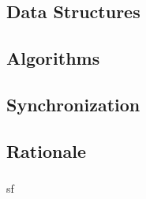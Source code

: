 \subsection{Data Structures}
	\subsubsection{}
	
\subsection{Algorithms}
	\subsubsection{}
	\subsubsection{}
\subsection{Synchronization}
	\subsubsection{}
	\subsubsection{}
\subsection{Rationale}
	\subsubsection{}
		sf